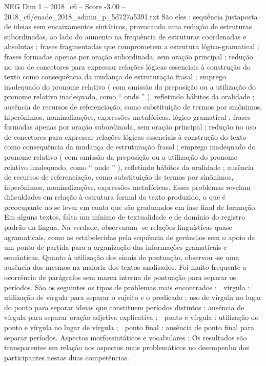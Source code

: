 \begin{textsample}{NEG Dim 1 – 2018\_c6 – Score -3.00 – 2018\_c6/enade\_2018\_admin\_p\_5d727a5391.txt}
São eles : sequência justaposta de ideias sem encaixamentos sintáticos, provocando uma redução de estruturas subordinadas, ao lado do aumento na frequência de estruturas coordenadas e absolutas ; frases fragmentadas que comprometem a estrutura lógico-gramatical ; frases formadas apenas por oração subordinada, sem oração principal ; redução no uso de conectores para expressar relações lógicas essenciais à construção do texto como consequência da mudança de estruturação frasal ; emprego inadequado do pronome relativo ( com omissão da preposição ou a utilização do pronome relativo inadequado, como “ onde ” ), refletindo hábitos da oralidade ; ausência de recursos de referenciação, como substituição de termos por sinônimos, hiperônimos, nominalizações, expressões metafóricas. lógico-gramatical ; frases formadas apenas por oração subordinada, sem oração principal ; redução no uso de conectores para expressar relações lógicas essenciais à construção do texto como consequência da mudança de estruturação frasal ; emprego inadequado do pronome relativo ( com omissão da preposição ou a utilização do pronome relativo inadequado, como “ onde ” ), refletindo hábitos da oralidade ; ausência de recursos de referenciação, como substituição de termos por sinônimos, hiperônimos, nominalizações, expressões metafóricas.
Esses problemas revelam dificuldades em relação à estrutura formal do texto produzido, o que é preocupante ao se levar em conta que são graduandos em fase final de formação.
Em alguns textos, falta um mínimo de textualidade e de domínio do registro padrão da língua.
Na verdade, observaram -se relações linguísticas quase agramaticais, como as estabelecidas pela sequência de gerúndios sem o apoio de um ponto de partida para a organização das informações gramaticais e semânticas.
Quanto à utilização dos sinais de pontuação, observou -se uma ausência dos mesmos na maioria dos textos analisados.
Foi muito frequente a ocorrência de parágrafos sem marca interna de pontuação para separar os períodos.
São os seguintes os tipos de problemas mais encontrados :  vírgula : utilização de vírgula para separar o sujeito e o predicado ; uso de vírgula no lugar do ponto para separar ideias que constituem períodos distintos ; ausência de vírgula para separar oração adjetiva explicativa ;  ponto e vírgula : utilização do ponto e vírgula no lugar de vírgula ;  ponto final : ausência de ponto final para separar períodos.
Aspectos morfossintáticos e vocabulares : Os resultados são transparentes em relação aos aspectos mais problemáticos no desempenho dos participantes nestas duas competências.

\end{textsample}
